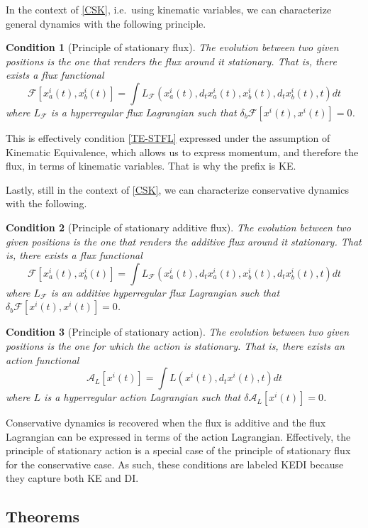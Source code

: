 \documentclass[nofootinbib,aps,pre]{revtex4-2}
\newtheorem{condth}{Condition}
\renewcommand*{\thecondth}{\Roman{condth}}
\newenvironment{condition}[2][]{\renewcommand{\thecondth}{#2}\begin{condth}[#1]\label{#2}}{\end{condth}\renewcommand{\thecondth}{\Roman{condth}}}
\begin{document}
In the context of \ref{CSK}, i.e.~using kinematic variables, we can characterize general dynamics with the following principle.
\begin{condition}[Principle of stationary flux]{KE-STFL}
	The evolution between two given positions is the one that renders the flux around it stationary. That is, there exists a flux functional $$\mathcal{F}[x^i_a(t), x^i_b(t)] = \int L_{\mathcal{F}}(x^i_a(t), d_t x^i_a(t), x^i_b(t), d_t x^i_b(t), t)dt$$ where $L_{\mathcal{F}}$ is a hyperregular flux Lagrangian such that  $\delta_b \mathcal{F}[x^i(t),x^i(t)] = 0$.
\end{condition}
This is effectively condition \ref{TE-STFL} expressed under the assumption of Kinematic Equivalence, which allows us to express momentum, and therefore the flux, in terms of kinematic variables. That is why the prefix is KE.

Lastly, still in the context of \ref{CSK}, we can characterize conservative dynamics with the following.
\begin{condition}[Principle of stationary additive flux]{KEDI-STFL}
	The evolution between two given positions is the one that renders the additive flux around it stationary. That is, there exists a flux functional $$\mathcal{F}[x^i_a(t), x^i_b(t)] = \int L_{\mathcal{F}}(x^i_a(t), d_t x^i_a(t), x^i_b(t), d_t x^i_b(t), t)dt$$ where $L_{\mathcal{F}}$ is an additive hyperregular flux Lagrangian such that  $\delta_b \mathcal{F}[x^i(t),x^i(t)] = 0$.
\end{condition}
\begin{condition}[Principle of stationary action]{KEDI-STAC}
	The evolution between two given positions is the one for which the action is stationary. That is, there exists an action functional $$\mathcal{A}_L[x^i(t)] = \int L(x^i(t), d_t x^i(t), t)dt$$ where $L$ is a hyperregular action Lagrangian such that $\delta \mathcal{A}_L[x^i(t)] = 0$.
\end{condition}
Conservative dynamics is recovered when the flux is additive and the flux Lagrangian can be expressed in terms of the action Lagrangian. Effectively, the principle of stationary action is a special case of the principle of stationary flux for the conservative case. As such, these conditions are labeled KEDI because they capture both KE and DI.

\subsection{Theorems}
\end{document}
